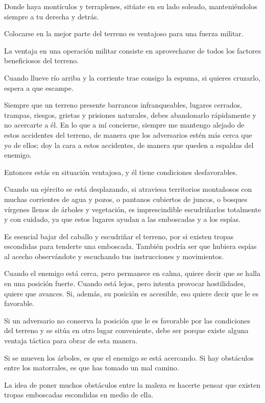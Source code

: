 Donde haya montículos y terraplenes, sitúate en su lado soleado, manteniéndolos siempre a tu derecha y detrás. 

Colocarse en la mejor parte del terreno es ventajoso para una fuerza militar.

La ventaja en una operación militar consiste en aprovecharse de todos los factores beneficiosos del terreno.

Cuando llueve río arriba y la corriente trae consigo la espuma, si quieres cruzarlo, espera a que escampe.

Siempre que un terreno presente barrancos infranqueables, lugares cerrados, trampas, riesgos, grietas y prisiones naturales, debes abandonarlo rápidamente y no acercarte a él. En lo que a mí concierne, siempre me mantengo alejado de estos accidentes del terreno, de manera que los adversarios estén más cerca que yo de ellos; doy la cara a estos accidentes, de manera que queden a espaldas del enemigo.

Entonces estás en situación ventajosa, y él tiene condiciones desfavorables.

Cuando un ejército se está desplazando, si atraviesa territorios montañosos con muchas corrientes de agua y pozos, o pantanos cubiertos de juncos, o bosques vírgenes llenos de árboles y vegetación, es imprescindible escudriñarlos totalmente y con cuidado, ya que estos lugares ayudan a las emboscadas y a los espías.

Es esencial bajar del caballo y escudriñar el terreno, por si existen tropas escondidas para tenderte una emboscada. También podría ser que hubiera espías al acecho observándote y escuchando tus instrucciones y movimientos.

Cuando el enemigo está cerca, pero permanece en calma, quiere decir que se halla en una posición fuerte. Cuando está lejos, pero intenta provocar hostilidades, quiere que avances. Si, además, su posición es accesible, eso quiere decir que le es favorable.

Si un adversario no conserva la posición que le es favorable por las condiciones del terreno y se sitúa en otro lugar conveniente, debe ser porque existe alguna ventaja táctica para obrar de esta manera.

Si se mueven los árboles, es que el enemigo se está acercando. Si hay obstáculos entre los matorrales, es que has tomado un mal camino.

La idea de poner muchos obstáculos entre la maleza es hacerte pensar que existen tropas emboscadas escondidas en medio de ella.


